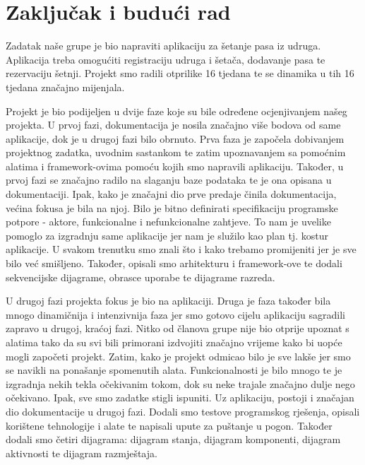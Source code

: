 \chapter{Zaključak i budući rad}
		
	
	Zadatak naše grupe je bio napraviti aplikaciju za šetanje pasa iz udruga. Aplikacija treba omogućiti registraciju udruga i šetača, dodavanje pasa te rezervaciju šetnji.  Projekt smo radili otprilike 16 tjedana te se dinamika u tih 16 tjedana značajno mijenjala.\par
	
	Projekt je bio podijeljen u dvije faze koje su bile određene ocjenjivanjem našeg projekta. U prvoj fazi, dokumentacija je nosila značajno više bodova od same aplikacije, dok je u drugoj fazi bilo obrnuto. Prva faza je započela dobivanjem projektnog zadatka, uvodnim sastankom te zatim upoznavanjem sa pomoćnim alatima i framework-ovima pomoću kojih smo napravili aplikaciju. Također, u prvoj fazi se značajno radilo na slaganju baze podataka te je ona opisana u dokumentaciji. Ipak, kako je značajni dio prve predaje činila dokumentacija, većina fokusa je bila na njoj. Bilo je bitno definirati specifikaciju programske potpore - aktore, funkcionalne i nefunkcionalne zahtjeve. To nam je uvelike pomoglo za izgradnju same aplikacije jer nam je služilo kao plan tj. kostur aplikacije. U svakom trenutku smo znali što i kako trebamo promijeniti jer je sve bilo već smišljeno. Također, opisali smo arhitekturu i framework-ove te dodali sekvencijske dijagrame, obrasce uporabe te dijagrame razreda.\par
	
	U drugoj fazi projekta fokus je bio na aplikaciji. Druga je faza također bila mnogo dinamičnija i intenzivnija faza jer smo gotovo cijelu aplikaciju sagradili zapravo u drugoj, kraćoj fazi. Nitko od članova grupe nije bio otprije upoznat s alatima tako da su svi bili primorani izdvojiti značajno vrijeme kako bi uopće mogli započeti projekt. Zatim, kako je projekt odmicao bilo je sve lakše jer smo se navikli na ponašanje spomenutih alata. Funkcionalnosti je bilo mnogo te je izgradnja nekih tekla očekivanim tokom, dok su neke trajale značajno dulje nego očekivano. Ipak, sve smo zadatke stigli ispuniti. Uz aplikaciju, postoji i značajan dio dokumentacije u drugoj fazi. Dodali smo testove programskog rješenja, opisali korištene tehnologije i alate te napisali upute za puštanje u pogon. Također dodali smo četiri dijagrama: dijagram stanja, dijagram komponenti, dijagram aktivnosti te dijagram razmještaja.\par
	
